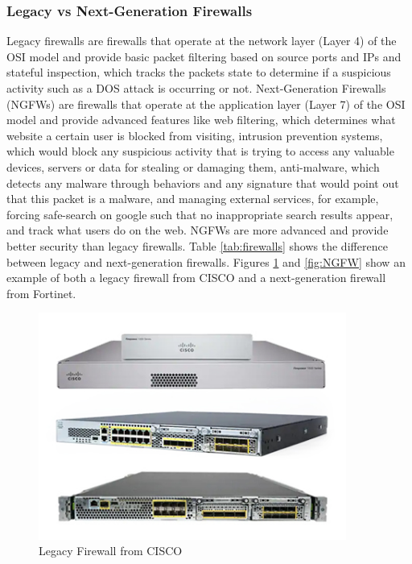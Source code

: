 \documentclass[12pt]{report}
\begin{document}
\subsubsection{Legacy vs Next-Generation Firewalls}
Legacy firewalls are firewalls that operate at the network layer (Layer 4) of the OSI model and provide basic packet filtering based on source ports and IPs and stateful inspection, which tracks the packets state to determine if a suspicious activity such as a DOS attack is occurring or not. Next-Generation Firewalls (NGFWs) are firewalls that operate at the application layer (Layer 7) of the OSI model and provide advanced features like web filtering, which determines what website a certain user is blocked from visiting, intrusion prevention systems, which would block any suspicious activity that is trying to access any valuable devices, servers or data for stealing or damaging them, anti-malware, which detects any malware through behaviors and any signature that would point out that this packet is a malware, and managing external services, for example, forcing safe-search on google such that no inappropriate search results appear, and track what users do on the web. NGFWs are more advanced and provide better security than legacy firewalls. Table \ref{tab:firewalls} shows the difference between legacy and next-generation firewalls. \cite{legtoNGFW}
Figures \ref{fig:legacyFW} and \ref{fig:NGFW} show an example of both a legacy firewall from CISCO and a next-generation firewall from Fortinet.

\begin{figure}[h]
    \centering
    \includegraphics[width=0.9\textwidth]{images/CiscoFW.jpg}
    \caption{Legacy Firewall from CISCO \cite{CFWIMG}}
    \label{fig:legacyFW}
\end{figure}
\end{document}
